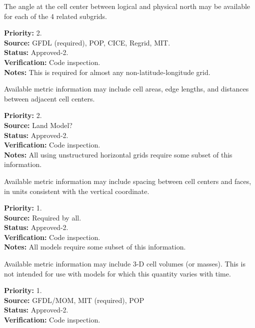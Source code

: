 The angle at the cell center between logical and physical north may be available
for each of the 4 related subgrids.
\begin{reqlist}
{\bf Priority:} 2. \\
{\bf Source:} GFDL (required), POP, CICE, Regrid, MIT. \\
{\bf Status:} Approved-2. \\
{\bf Verification:} Code inspection. \\
{\bf Notes:} This is required for almost any non-latitude-longitude grid.
\end{reqlist}

Available metric information may include cell areas, edge lengths, and distances between
adjacent cell centers.
\begin{reqlist}
{\bf Priority:} 2. \\
{\bf Source:} Land Model? \\
{\bf Status:} Approved-2. \\
{\bf Verification:} Code inspection. \\
{\bf Notes:} All using unstructured horizontal grids require some subset of this
information.
\end{reqlist}

Available metric information may include spacing between cell centers and faces, in
units consistent with the vertical coordinate.
\begin{reqlist}
{\bf Priority:} 1. \\
{\bf Source:} Required by all. \\
{\bf Status:} Approved-2. \\
{\bf Verification:} Code inspection. \\
{\bf Notes:} All models require some subset of this information.
\end{reqlist}

Available metric information may include 3-D cell volumes (or masses).  This is not
intended for use with models for which this quantity varies with time.
\begin{reqlist}
{\bf Priority:} 1. \\
{\bf Source:} GFDL/MOM, MIT (required), POP \\
{\bf Status:} Approved-2. \\
{\bf Verification:} Code inspection.
\end{reqlist}

